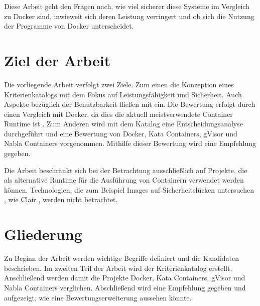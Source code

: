 Diese Arbeit geht den Fragen nach, wie viel sicherer diese Systeme im Vergleich zu Docker sind, inwieweit sich deren Leistung verringert und ob sich die Nutzung der Programme von Docker unterscheidet.

\section{Ziel der Arbeit}




Die vorliegende Arbeit verfolgt zwei Ziele. Zum einen die Konzeption eines Kriterienkatalogs mit dem Fokus auf Leistungsfähigkeit und Sicherheit. Auch Aspekte bezüglich der Benutzbarkeit fließen mit ein. Die Bewertung erfolgt durch einen Vergleich mit Docker, da dies die aktuell meistverwendete Container Runtime ist \cite[vgl.][5]{sysdig.2019}. Zum Anderen wird mit dem Katalog eine Entscheidungsanalyse durchgeführt und eine Bewertung von Docker, Kata Containers, gVisor und Nabla Containers vorgenommen. Mithilfe dieser Bewertung wird eine Empfehlung gegeben.

Die Arbeit beschränkt sich bei der Betrachtung ausschließlich auf Projekte, die als alternative Runtime für die Ausführung von Containern verwendet werden können. 
Technologien, die zum Beispiel Images auf Sicherheitslücken untersuchen \cite[vgl.][]{Shu.2017b}, wie Clair \cite[][]{Quay.}, werden nicht betrachtet. 

\section{Gliederung}
\label{sec:gliederung}

Zu Beginn der Arbeit werden wichtige Begriffe definiert und die Kandidaten beschrieben. Im zweiten Teil der Arbeit wird der Kriterienkatalog erstellt. Anschließend werden damit die Projekte Docker, Kata Containers, gVisor und Nabla Containers verglichen. Abschließend wird eine Empfehlung gegeben und aufgezeigt, wie eine Bewertungserweiterung aussehen könnte.


